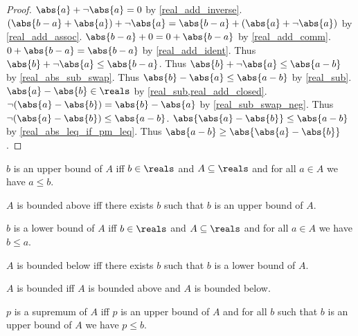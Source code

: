 \begin{proof}
    $\abs{a} + \neg{\abs{a}} = 0$ by \cref{real_add_inverse}.
    $(\abs{b - a} + \abs{a}) + \neg{\abs{a}} = \abs{b - a} + (\abs{a} + \neg{\abs{a}})$ by \cref{real_add_assoc}.
    $\abs{b - a} + 0 = 0 + \abs{b - a}$ by \cref{real_add_comm}.
    $0 + \abs{b - a} = \abs{b - a}$ by \cref{real_add_ident}.
    Thus $\abs{b} + \neg{\abs{a}} \leq \abs{b - a}$.
    Thus $\abs{b} + \neg{\abs{a}} \leq \abs{a - b}$ by \cref{real_abs_sub_swap}.
    Thus $\abs{b} - \abs{a} \leq \abs{a - b}$ by \cref{real_sub}.
    $\abs{a} - \abs{b}\in\reals$ by \cref{real_sub,real_add_closed}.
    $\neg{(\abs{a} - \abs{b})} = \abs{b} - \abs{a}$ by \cref{real_sub_swap_neg}.
    Thus $\neg{(\abs{a} - \abs{b})} \leq \abs{a - b}$.
    $\abs{\abs{a} - \abs{b}} \leq \abs{a - b}$ by \cref{real_abs_leq_if_pm_leq}.
    Thus $\abs{a - b} \geq \abs{\abs{a} - \abs{b}}$.
\end{proof}

\begin{definition}\label{real_upper_bound}
    $b$ is an upper bound of $A$ iff $b\in\reals$ and $A\subseteq\reals$ and for all $a\in A$ we have $a \leq b$.
\end{definition}

\begin{definition}\label{real_bounded_above}
    $A$ is bounded above iff there exists $b$ such that $b$ is an upper bound of $A$.
\end{definition}

\begin{definition}\label{real_lower_bound}
    $b$ is a lower bound of $A$ iff $b\in\reals$ and $A\subseteq\reals$ and for all $a\in A$ we have $b \leq a$.
\end{definition}

\begin{definition}\label{real_bounded_below}
    $A$ is bounded below iff there exists $b$ such that $b$ is a lower bound of $A$.
\end{definition}

\begin{definition}\label{real_bounded}
    $A$ is bounded iff $A$ is bounded above and $A$ is bounded below.
\end{definition}

\begin{definition}\label{real_supremum}
    $p$ is a supremum of $A$ iff $p$ is an upper bound of $A$ and for all $b$ such that $b$ is an upper bound of $A$ we have $p \leq b$.
\end{definition}


